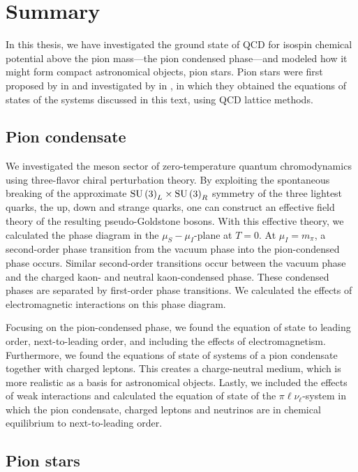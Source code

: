 \section{Summary}


In this thesis, we have investigated the ground state of QCD for isospin chemical potential above the pion mass---the pion condensed phase---and modeled how it might form compact astronomical objects, pion stars.
Pion stars were first proposed by \citeauthor{carignanoScrutinizingPionCondensed2017} in \autocite{carignanoScrutinizingPionCondensed2017} and investigated by \citeauthor{brandtNewClassCompact2018} in \autocite{brandtNewClassCompact2018}, in which they obtained the equations of states of the systems discussed in this text, using QCD lattice methods.


\subsection{Pion condensate}

We investigated the meson sector of zero-temperature quantum chromodynamics using three-flavor chiral perturbation theory.
By exploiting the spontaneous breaking of the approximate $\text{SU}\left(3\right)_L\times\text{SU}\left(3\right)_R$ symmetry of the three lightest quarks, the up, down and strange quarks, one can construct an effective field theory of the resulting pseudo-Goldstone bosons.
With this effective theory, we calculated the phase diagram in the $\mu_S-\mu_I$-plane at $T = 0$.
At $\mu_I = m_\pi$, a second-order phase transition from the vacuum phase into the pion-condensed phase occurs.
Similar second-order transitions occur between the vacuum phase and the charged kaon- and neutral kaon-condensed phase.
These condensed phases are separated by first-order phase transitions.
We calculated the effects of electromagnetic interactions on this phase diagram.

Focusing on the pion-condensed phase, we found the equation of state to leading order, next-to-leading order, and including the effects of electromagnetism.
Furthermore, we found the equations of state of systems of a pion condensate together with charged leptons.
This creates a charge-neutral medium, which is more realistic as a basis for astronomical objects.
Lastly, we included the effects of weak interactions and calculated the equation of state of the $\pi\ell\nu_\ell$-system in which the pion condensate, charged leptons and neutrinos are in chemical equilibrium to next-to-leading order.


\subsection{Pion stars}

